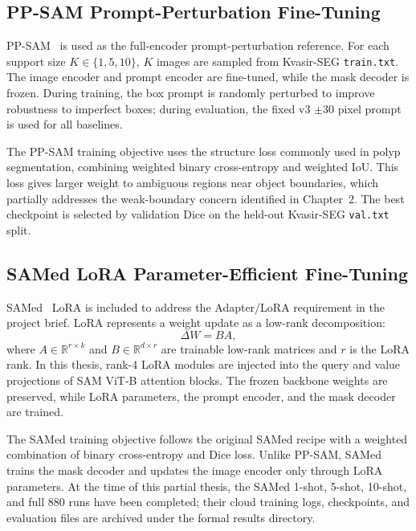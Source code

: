\subsection{PP-SAM Prompt-Perturbation Fine-Tuning}
\label{sec:ppsam-recipe}

PP-SAM~\cite{rahman2024ppsam} is used as the full-encoder prompt-perturbation reference. For each support size $K\in\{1,5,10\}$, $K$ images are sampled from Kvasir-SEG \texttt{train.txt}. The image encoder and prompt encoder are fine-tuned, while the mask decoder is frozen. During training, the box prompt is randomly perturbed to improve robustness to imperfect boxes; during evaluation, the fixed v3 $\pm30$ pixel prompt is used for all baselines.

The PP-SAM training objective uses the structure loss commonly used in polyp segmentation, combining weighted binary cross-entropy and weighted IoU. This loss gives larger weight to ambiguous regions near object boundaries, which partially addresses the weak-boundary concern identified in Chapter~2. The best checkpoint is selected by validation Dice on the held-out Kvasir-SEG \texttt{val.txt} split.

\subsection{SAMed LoRA Parameter-Efficient Fine-Tuning}
\label{sec:samed-recipe}

SAMed~\cite{zhang2023samed} LoRA is included to address the Adapter/LoRA requirement in the project brief. LoRA represents a weight update as a low-rank decomposition:
\begin{equation}
  \Delta W = BA,
  \label{eq:lora-update}
\end{equation}
where $A\in\mathbb{R}^{r\times k}$ and $B\in\mathbb{R}^{d\times r}$ are trainable low-rank matrices and $r$ is the LoRA rank. In this thesis, rank-4 LoRA modules are injected into the query and value projections of SAM ViT-B attention blocks. The frozen backbone weights are preserved, while LoRA parameters, the prompt encoder, and the mask decoder are trained.

The SAMed training objective follows the original SAMed recipe with a weighted combination of binary cross-entropy and Dice loss. Unlike PP-SAM, SAMed trains the mask decoder and updates the image encoder only through LoRA parameters. At the time of this partial thesis, the SAMed 1-shot, 5-shot, 10-shot, and full 880 runs have been completed; their cloud training logs, checkpoints, and evaluation files are archived under the formal results directory.

